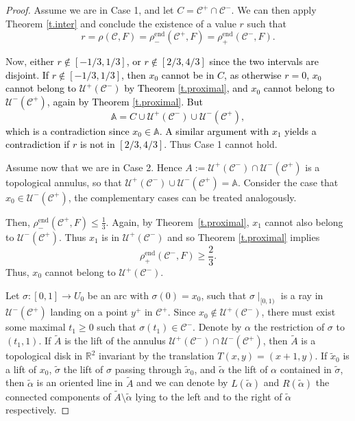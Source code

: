 \documentclass[12pt,a4paper]{amsart}
\theoremstyle{definition}
\theoremstyle{remark}
\newcommand{\R}{\mathbb{R}}
\newcommand{\A}{\mathbb{A}}
\begin{document}
\begin{proof}
Assume we are  in Case 1, and let $C=\mathcal{C}^{+}\cap\mathcal{C}^{-}$. We can then apply Theorem \ref{t.inter} and conclude the existence of a value $r$ such that
\[
r = \rho(\mathcal{C}, F)= \rho^{\mathrm{end}}_-(\mathcal{C}^+,F)
= \rho^{\mathrm{end}}_+(\mathcal{C}^-,F).
\]

Now, \textcolor{black}{either $r\notin [-1/3, 1/3]$, or $r\notin [2/3, 4/3]$ since the two intervals are disjoint. If $r\notin [-1/3, 1/3]$, then $x_0$ cannot be in $C$, as otherwise $r=0$, $x_0$ cannot belong to $\mathcal{U}^{+}(\mathcal{C}^{-})$ by Theorem \ref{t.proximal}, and $x_0$ cannot belong to $\mathcal{U}^{-}(\mathcal{C}^{+})$, again by Theorem \ref{t.proximal}. But 
$$\A=C\cup \mathcal{U}^{+}(\mathcal{C}^{-}) \cup \mathcal{U}^{-}(\mathcal{C}^{+}),$$
which is a contradiction since $x_0\in\A$. A similar argument with $x_1$ yields a contradiction if $r$ is not in $[2/3, 4/3]$.} Thus Case 1 cannot hold.

Assume now that we are in Case 2. Hence 
$A:=\mathcal{U}^{+}(\mathcal{C}^{-})\cap \mathcal{U}^{-}(\mathcal{C}^{+})$ 
is a topological annulus, so that $\mathcal{U}^{+}(\mathcal{C}^{-})\cup \mathcal{U}^{-}(\mathcal{C}^{+})=\A$. Consider
the case that $x_0\in\mathcal{U}^{-}(\mathcal{C}^{+})$, the complementary cases can be treated analogously. 


Then, $\rho^{\mathrm{end}}_{-}(\mathcal{C}^{+},F)\le \frac{1}{3}$. Again, by Theorem~\ref{t.proximal}, $x_1$ cannot also belong to $\mathcal{U}^{-}(\mathcal{C}^{+})$. Thus $x_1$ is in $\mathcal{U}^{+}(\mathcal{C}^{-})$ and so Theorem
\ref{t.proximal} implies
$$\rho^{\mathrm{end}}_+(\mathcal{C}^-,F)\geq \frac{2}{3}.$$
Thus, $x_0$ cannot belong to $\mathcal{U}^{+}(\mathcal{C}^{-})$.

Let  $\sigma:[0, 1] \to U_0$ be an arc with $\sigma(0)=x_0$, such that $\sigma\mid_{[0,1)}$ is a ray in $\mathcal{U}^{-}(\mathcal{C}^{+})$ landing on a point $y^{+}$ in $\mathcal{C}^{+}$.  Since $x_0\notin \mathcal{U}^{+}(\mathcal{C}^{-})$, there must exist some maximal $t_1\ge 0$ such that $\sigma(t_1)\in\mathcal{C}^{-}$. Denote by $\alpha$ the restriction of $\sigma$ to $(t_1,1)$.  If $\tilde A$ is the lift of the annulus $\mathcal{U}^{+}(\mathcal{C}^{-})\cap \mathcal{U}^{-}(\mathcal{C}^{+})$,  then $\widetilde A$ is a topological disk in $\R^2$ invariant by the translation $T(x,y)=(x+1,y)$. If $\widetilde x_0$ is a lift of $x_0$, $\widetilde \sigma$ the lift of $\sigma$ passing through $\tilde{x}_0$, and $\tilde \alpha$ the lift of $\alpha$ contained in $\widetilde \sigma$, then $\tilde \alpha$ is an oriented  line in $\widetilde A$ and we can denote by $L(\tilde \alpha)$ and $R(\tilde \alpha)$ the connected components of $\tilde{A}\setminus \tilde{\alpha}$ lying to the left and to the right of $\tilde{\alpha}$
respectively.


\end{proof}
\end{document}
